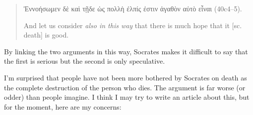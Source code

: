 \documentclass[11pt]{article}
\begin{document}
\begin{quote}

    {\g
    Ἐννοήσωμεν δὲ καὶ τῇδε ὡς πολλὴ ἐλπίς ἐστιν ἀγαθὸν αὐτὸ εἶναι
    } (40c4--5).

    And let us consider \emph{also in this way} that there is much hope
    that it [sc. death] is good.

\end{quote}

By linking the two arguments in this way, Socrates makes it difficult to
say that the first is serious but the second is only speculative.

I'm surprised that people have not been more bothered by Socrates on death
as the complete destruction of the person who dies.  The argument is far
worse (or odder) than people imagine.  I think I may try to write an
article about this, but for the moment, here are my concerns:
\end{document}
